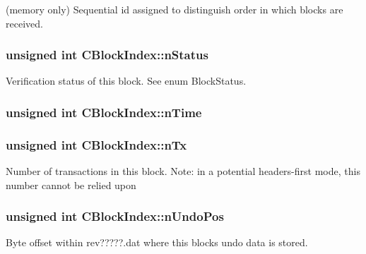 (memory only) Sequential id assigned to distinguish order in which blocks are received. 

\hypertarget{class_c_block_index_ac5a336b45ca70e3ed2fc090bf2ee3011}{}
\subsubsection[{n\+Status}]{\setlength{\rightskip}{0pt plus 5cm}unsigned int C\+Block\+Index\+::n\+Status}\label{class_c_block_index_ac5a336b45ca70e3ed2fc090bf2ee3011}


Verification status of this block. See enum Block\+Status. 

\hypertarget{class_c_block_index_a4b687a226e9e166b0f91c1b616b543a6}{}
\subsubsection[{n\+Time}]{\setlength{\rightskip}{0pt plus 5cm}unsigned int C\+Block\+Index\+::n\+Time}\label{class_c_block_index_a4b687a226e9e166b0f91c1b616b543a6}
\hypertarget{class_c_block_index_ac8e219a377839d2f9133a4387f46e44e}{}
\subsubsection[{n\+Tx}]{\setlength{\rightskip}{0pt plus 5cm}unsigned int C\+Block\+Index\+::n\+Tx}\label{class_c_block_index_ac8e219a377839d2f9133a4387f46e44e}
Number of transactions in this block. Note\+: in a potential headers-\/first mode, this number cannot be relied upon \hypertarget{class_c_block_index_a865ddd56406c23e98cdc61511a61eb64}{}
\subsubsection[{n\+Undo\+Pos}]{\setlength{\rightskip}{0pt plus 5cm}unsigned int C\+Block\+Index\+::n\+Undo\+Pos}\label{class_c_block_index_a865ddd56406c23e98cdc61511a61eb64}


Byte offset within rev?????.dat where this block\textquotesingle{}s undo data is stored. 

